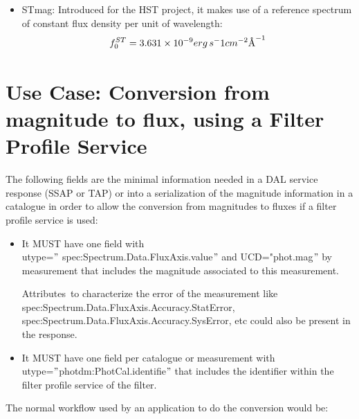 \documentclass[11pt,a4paper]{ivoa}
\newcommand{\angstrom}{\mbox{\normalfont\AA}}
\begin{document}
\begin{itemize}
	\item{STmag: Introduced for the HST project, it makes use of a reference spectrum of 
	constant flux density per unit of wavelength:
\begin{equation} \label{eq:32}
f_0^{ST} = 3.631 \times 10^{-9} erg\, s^-1 cm^{-2} \angstrom ^{-1}
\end{equation}}

\end{itemize}
\section{Use Case: Conversion from magnitude to flux, using a Filter Profile Service}
The following fields are the minimal information needed in a DAL service response (SSAP 
or TAP) or into a serialization of the magnitude information in a catalogue in order to 
allow the conversion from magnitudes to fluxes if a filter profile service is used:
\par

\begin{itemize}
	\item{It MUST have one field with\\ utype=$"$ spec:Spectrum.Data.FluxAxis.value$"$  
	and UCD="phot.mag$"$  by measurement that includes the magnitude associated to 
	this measurement. \par}

Attributes\ to characterize the error of the measurement like\\  
spec:Spectrum.Data.FluxAxis.Accuracy.StatError,\\ 
spec:Spectrum.Data.FluxAxis.Accuracy.SysError, etc could also be present 
in the response.
\par

	\item{It MUST have one field per catalogue or measurement 
	with\\ utype=$"$photdm:PhotCal.identifie$"$  that includes the identifier within the 
	filter profile service of the filter.}
\end{itemize}\par

The normal workflow used by an application to do the conversion would be:
\par
\end{document}
